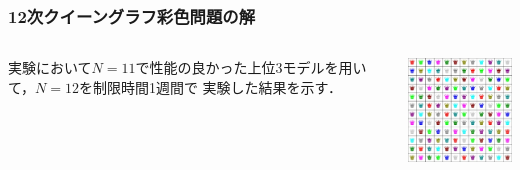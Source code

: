 \documentclass [dvipdfmx,11pt]{beamer}
\begin{document}
\begin{frame}
    \frametitle{12次クイーングラフ彩色問題の解}
    \begin{columns}
        \begin{column}{0.4\textwidth}
            実験において$N=11$で性能の良かった上位3モデルを用いて，$N=12$を制限時間1週間で
            実験した結果を示す．
        \end{column}
        \begin{column}{0.6\textwidth}
            \begin{exampleblock}{}\centering
                \includegraphics[width=5cm]{images/qgcp_12.jpg}
            \end{exampleblock}
        \end{column}
    \end{columns}
    \begin{block}{}\centering
        {\tiny }
    \end{block}
\end{frame}


\end{document}
